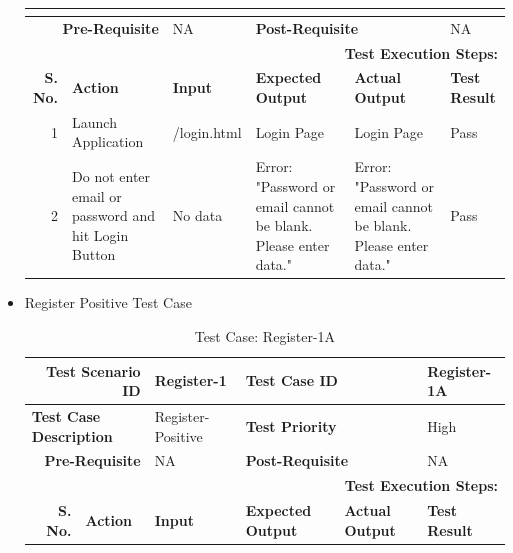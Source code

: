 \documentclass[a4paper, hidelinks, 12pt]{report}
\begin{document}
\begin{itemize}
\begin{table}[H]
\begin{tabular}{|r|p{4.355em}|p{7.715em}|p{6.43em}|p{5.855em}|p{5.07em}|}
    \multicolumn{2}{|l|}{} & \multicolumn{1}{l|}{} & \multicolumn{2}{l|}{} & \multicolumn{1}{l|}{} \\
    \midrule
    \multicolumn{2}{|p{13.425em}|}{\textbf{Pre-Requisite}} & NA    & \multicolumn{2}{p{12.285em}|}{\textbf{Post-Requisite}} & NA \\
    \midrule
    \multicolumn{6}{p{38.495em}|}{\textbf{Test Execution Steps:}} \\
    \midrule
    \multicolumn{1}{|p{5.07em}|}{\textbf{S. No.}} & \textbf{Action } & \textbf{Input} & \textbf{Expected Output} & \textbf{Actual Output} & \textbf{Test Result} \\
    \midrule
    1     & Launch Application & /login.html & Login Page & Login Page & Pass \\
    \midrule
    2     & Do not enter email or password and hit Login Button & No data & Error: "Password or email cannot be blank. Please enter data." & Error: "Password or email cannot be blank. Please enter data." & Pass \\
    \bottomrule
    \end{tabular}%
  \label{tab:Test Case: Login-2A}%
\end{table}%
\item{Register Positive Test Case}
\begin{table}[H]
  \centering
  \caption{Test Case: Register-1A}
    \begin{tabular}{|r|p{5.355em}|p{7.715em}|p{6.43em}|p{5.855em}|p{5.07em}|}
    \toprule
    \multicolumn{2}{|p{13.425em}|}{\textbf{Test Scenario ID}} & Register-1 & \multicolumn{2}{p{12.285em}|}{\textbf{Test Case ID}} & Register-1A \\
    \midrule
    \multicolumn{2}{|l|}{\multirow{2}[2]{*}{\textbf{Test Case Description}}} & \multirow{2}[2]{*}{Register-Positive} & \multicolumn{2}{l|}{\multirow{2}[2]{*}{\textbf{Test Priority}}} & \multirow{2}[2]{*}{High} \\
    \multicolumn{2}{|l|}{} & \multicolumn{1}{l|}{} & \multicolumn{2}{l|}{} & \multicolumn{1}{l|}{} \\
    \midrule
    \multicolumn{2}{|p{13.425em}|}{\textbf{Pre-Requisite}} & NA    & \multicolumn{2}{p{12.285em}|}{\textbf{Post-Requisite}} & NA \\
    \midrule
    \multicolumn{6}{p{38.495em}|}{\textbf{Test Execution Steps:}} \\
    \midrule
    \multicolumn{1}{|p{5.07em}|}{\textbf{S. No.}} & \textbf{Action } & \textbf{Input} & \textbf{Expected Output} & \textbf{Actual Output} & \textbf{Test Result} \\

\end{tabular}
\end{table}
\end{itemize}
\end{document}
